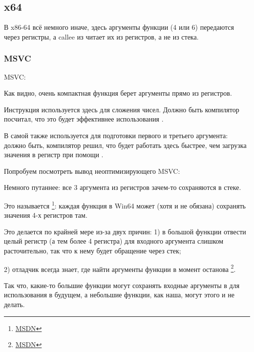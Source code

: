 \subsection{x64}

В x86-64 всё немного иначе, здесь аргументы функции (4 или 6) передаются через регистры, 
а \gls{callee} из читает их из регистров, а не из стека.

\subsubsection{MSVC}

\Optimizing MSVC:



Как видно, очень компактная функция \ttf берет аргументы прямо из регистров.

Инструкция \LEA используется здесь для сложения чисел. 
Должно быть компилятор посчитал, что это будет эффективнее использования .

В самой \main{} \LEA{} также используется для подготовки первого и третьего аргумента: должно быть,
компилятор решил, что \LEA{} будет работать здесь быстрее, чем загрузка значения в регистр при помощи \MOV.

Попробуем посмотреть вывод неоптимизирующего MSVC:



Немного путаннее: все 3 аргумента из регистров зачем-то сохраняются в стеке.

\label{shadow_space}
Это называется  \footnote{\href{http://go.yurichev.com/17256}{MSDN}}: 
каждая функция в Win64 может (хотя и не обязана) сохранять значения 4-х регистров там.

Это делается по крайней мере из-за двух причин: 
1) в большой функции отвести целый регистр (а тем более 4 регистра) для входного аргумента 
слишком расточительно, так что к нему будет обращение через стек;

2) отладчик всегда знает, где найти аргументы функции в момент останова
\footnote{\href{http://go.yurichev.com/17257}{MSDN}}.

Так что, какие-то большие функции могут сохранять входные аргументы в  
для использования в будущем, а небольшие функции, как наша, могут этого и не делать.

